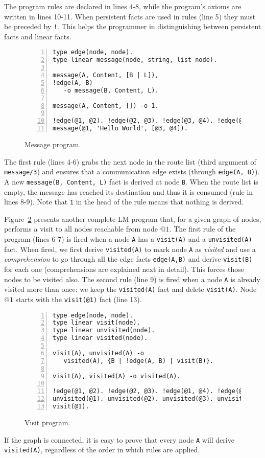 The program rules are declared in lines 4-8, while the program's axioms are written in lines 10-11.
When persistent facts are used in rules (line 5) they must be
preceded by \texttt{!}. This helps the programmer in distinguishing between persistent facts and linear facts.

\begin{figure}[h!]
\small\begin{Verbatim}[numbers=left]
type edge(node, node).
type linear message(node, string, list node).

message(A, Content, [B | L]),
!edge(A, B)
   -o message(B, Content, L).

message(A, Content, []) -o 1.

!edge(@1, @2). !edge(@2, @3). !edge(@3, @4). !edge(@1, @3).
message(@1, 'Hello World', [@3, @4]).
\end{Verbatim}
\caption{Message program.}
  \label{code:message}
\end{figure}

The first rule (lines 4-6) grabs the next node in the route list (third argument of \texttt{message/3}) and
ensures that a communication edge exists (through \texttt{edge(A, B)}).
A new \texttt{message(B,~Content,~L)} fact is derived at node \texttt{B}.
When the route list is empty, the message has reached its destination and thus it is consumed
(rule in lines 8-9). Note that \texttt{1} in the head of the rule means that nothing is derived.

Figure~\ref{code:visit} presents another complete LM program that, for a given graph
of nodes, performs a visit to all nodes reachable from node $@1$.
The first rule of the program (lines 6-7) is fired when a node \texttt{A} has a \texttt{visit(A)} and a \texttt{unvisited(A)} fact.
When fired, we first derive \texttt{visited(A)} to mark node \texttt{A} as \textit{visited} and use a
\emph{comprehension} to go through all the edge facts \texttt{edge(A,B)} and derive \texttt{visit(B)} for each
one (comprehensions are explained next in detail). This forces those nodes to be visited also.
The second rule (line 9) is fired when a
node \texttt{A} is already visited more than once: we keep the \texttt{visited(A)} fact and delete \texttt{visit(A)}.
Node $@1$ starts with the \texttt{visit(@1)} fact (line 13).

\begin{figure}[h!]
\small\begin{Verbatim}[numbers=left]
type edge(node, node).
type linear visit(node).
type linear unvisited(node).
type linear visited(node).

visit(A), unvisited(A) -o
   visited(A), {B | !edge(A, B) | visit(B)}.

visit(A), visited(A) -o visited(A).

!edge(@1, @2). !edge(@2, @3). !edge(@1, @4). !edge(@2, @4).
unvisited(@1). unvisited(@2). unvisited(@3). unvisited(@4).
visit(@1).
\end{Verbatim}
  \caption{Visit program.}
  \label{code:visit}
\end{figure}
\normalsize

If the graph is connected, it is easy to prove that every node \texttt{A} will derive \texttt{visited(A)},
regardless of the order in which rules are applied.
